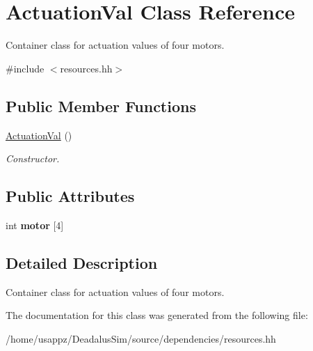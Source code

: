 \hypertarget{classActuationVal}{\section{\-Actuation\-Val \-Class \-Reference}
\label{classActuationVal}
}


\-Container class for actuation values of four motors.  




{\ttfamily \#include $<$resources.\-hh$>$}

\subsection*{\-Public \-Member \-Functions}
\begin{DoxyCompactItemize}
\item 
\hypertarget{classActuationVal_a3ae2be4775a524a441fed113ff621a39}{\hyperlink{classActuationVal_a3ae2be4775a524a441fed113ff621a39}{\-Actuation\-Val} ()}\label{classActuationVal_a3ae2be4775a524a441fed113ff621a39}

\begin{DoxyCompactList}\small\item\em \-Constructor. \end{DoxyCompactList}\end{DoxyCompactItemize}
\subsection*{\-Public \-Attributes}
\begin{DoxyCompactItemize}
\item 
\hypertarget{classActuationVal_a43157138ca9d9e600252f8c41ce3d032}{int {\bfseries motor} \mbox{[}4\mbox{]}}\label{classActuationVal_a43157138ca9d9e600252f8c41ce3d032}

\end{DoxyCompactItemize}


\subsection{\-Detailed \-Description}
\-Container class for actuation values of four motors. 

\-The documentation for this class was generated from the following file\-:\begin{DoxyCompactItemize}
\item 
/home/usappz/\-Deadalus\-Sim/source/dependencies/resources.\-hh\end{DoxyCompactItemize}
